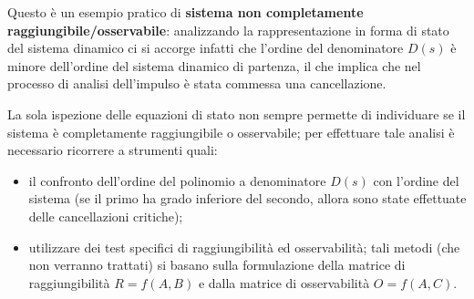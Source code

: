 		
		Questo è un esempio pratico di \textbf{sistema non completamente raggiungibile/osservabile}: analizzando la rappresentazione in forma di stato del sistema dinamico ci si accorge infatti che l'ordine del denominatore $D(s)$ è minore dell'ordine del sistema dinamico di partenza, il che implica che nel processo di analisi dell'impulso è stata commessa una cancellazione.
		
		\vspace{3mm}
		
		La sola ispezione delle equazioni di stato non sempre permette di individuare se il sistema è completamente raggiungibile o osservabile; per effettuare tale analisi è necessario ricorrere a strumenti quali:
		\begin{itemize}
			\item il confronto dell'ordine del polinomio a denominatore $D(s)$ con l'ordine del sistema (se il primo ha grado inferiore del secondo, allora sono state effettuate delle cancellazioni critiche);
			\item utilizzare dei test specifici di raggiungibilità ed osservabilità; tali metodi (che non verranno trattati) si basano sulla formulazione della matrice di raggiungibilità $R = f(A,B)$ e dalla matrice di osservabilità $O = f(A,C)$.
		\end{itemize}
		
		
		
		
		
		
		
		
		
	